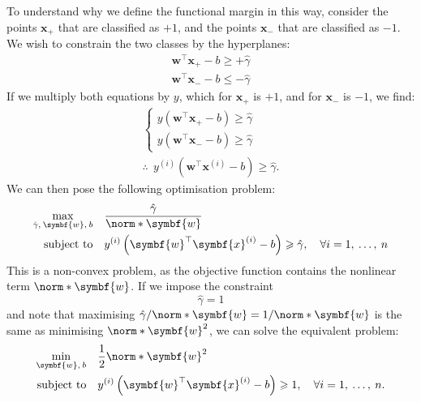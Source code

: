 \documentclass{article}
\begin{document}
To understand why we define the functional margin in this way, consider
the points \(\symbf{x}_{{+}}\) that are classified as \({+}1\), and the
points \(\symbf{x}_{{-}}\) that are classified as \({-}1\). We wish to
constrain the two classes by the hyperplanes:
\begin{gather*}
    \symbf{w}^\top \symbf{x}_{{+}} - b \geqslant {+}\hat{\gamma} \\
    \symbf{w}^\top \symbf{x}_{{-}} - b \leqslant {-}\hat{\gamma}
\end{gather*}
If we multiply both equations by \(y\),
which for \(\symbf{x}_{{+}}\) is \({+}1\), and for \(\symbf{x}_{{-}}\)
is \({-}1\), we find:
\begin{gather*}
    \begin{cases}
        y \left( \symbf{w}^\top \symbf{x}_{{+}} - b \right) \geqslant \hat{\gamma} \\
        y \left( \symbf{w}^\top \symbf{x}_{{-}} - b \right) \geqslant \hat{\gamma}
    \end{cases}
    \\[1ex]
    \therefore\:\: y^{\left( i \right)} \left( \symbf{w}^\top \symbf{x}^{\left( i \right)} - b \right) \geqslant \hat{\gamma}.
\end{gather*}
We can then pose the following optimisation problem:
\begin{align*}
    \max_{\hat{\gamma},\: \symbf{w},\: b} \quad & \frac{\hat{\gamma}}{\norm*{\symbf{w}}}                                                                                                                                                          \\
    \text{subject to} \quad     & y^{\left( i \right)} \left( \symbf{w}^\top \symbf{x}^{\left( i \right)} - b \right) \geqslant \hat{\gamma}, \quad \forall i = 1,\: \dots,\: n
\end{align*}
This is a non-convex problem, as the objective function contains the
nonlinear term \(\norm*{\symbf{w}}\). If we impose the constraint
\begin{equation*}
    \hat{\gamma} = 1
\end{equation*}
and note that maximising \(\hat{\gamma} / \norm*{\symbf{w}} = 1 / \norm*{\symbf{w}}\)
is the same as minimising \(\norm*{\symbf{w}}^2\), we can solve the
equivalent problem:
\begin{align*}
    \min_{\symbf{w},\: b} \quad & \frac{1}{2}\norm*{\symbf{w}}^2                                                                                                                                                          \\
    \text{subject to} \quad     & y^{\left( i \right)} \left( \symbf{w}^\top \symbf{x}^{\left( i \right)} - b \right) \geqslant 1, \quad \forall i = 1,\: \dots,\: n.
\end{align*}
\end{document}
